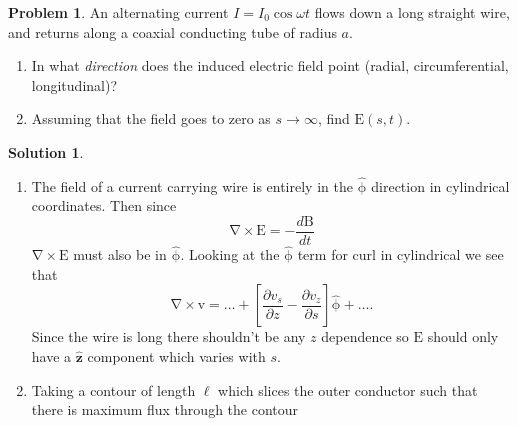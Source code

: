 \documentclass[10pt]{article}
\theoremstyle{definition}
\newtheorem{problem}{Problem}
\newtheorem{soln}{Solution}
\newcommand{\uz}{\hat{\mathbf{z}}}
\newcommand{\uv}[1]{\hat{\bv{{#1}}}}
\renewcommand{\curl}[1]{\bv{\nabla}\times #1}
\newcommand{\bv}[1]{\bm{\mathrm{#1}}}
\begin{document}
\begin{problem}
An alternating current $I=I_0\cos\omega t$ flows down a long straight wire, and returns along a coaxial conducting tube
of radius $a$.
\begin{enumerate}[label=(\alph*)]
  \item In what \emph{direction} does the induced electric field point (radial, circumferential, longitudinal)?
  \item Assuming that the field goes to zero as $s \to \infty$, find $\bv{E}(s,t)$.
\end{enumerate}
\end{problem}
\begin{soln}
  \begin{enumerate}[label=(\alph*)]
    \item The field of a current carrying wire is entirely in the $\uv{\phi}$ direction in cylindrical coordinates. Then since
          $$\curl{\bv{E}}=-\frac{d\bv{B}}{dt}$$
          $\curl{\bv{E}}$ must also be in $\uv{\phi}$. Looking at the $\uv{\phi}$ term for curl in
          cylindrical we see that
          $$\curl{\bv{v}}=\dots+\left[\frac{\partial v_s}{\partial z}-\frac{\partial v_z}{\partial s}\right]\uv{\phi}+\dots.$$
          Since the wire is long there shouldn't be any $z$ dependence so $\bv{E}$ should only have a $\uz$ component which varies with
          $s$.
    \item Taking a contour of length $\ell$ which slices the outer conductor such that there is maximum flux
          through the contour
          \begin{figure}[h]
            \centering
\end{figure}
\end{enumerate}
\end{soln}
\end{document}
